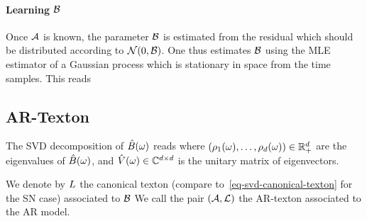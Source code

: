 \paragraph*{Learning $\mathcal{B}$}

Once $\mathcal{A}$ is known, the parameter $\mathcal{B}$ is estimated from the residual
which should be distributed according to $\mathcal{N}(0, \mathcal{B})$. One thus estimates $\mathcal{B}$ using the MLE estimator of a Gaussian process which is stationary in space from the time samples. This reads




\subsection{AR-Texton}

The SVD decomposition of $\hat B(\omega)$ reads
where $(\rho_1(\omega),\ldots,\rho_d(\omega)) \in \mathbb{R}_+^d$ are the eigenvalues of $\hat B(\omega)$, and $\hat V(\omega) \in \mathbb{C}^{d \times d}$ is the unitary matrix of eigenvectors.

We denote by $L$ the canonical texton (compare to~\eqref{eq-svd-canonical-texton} for the SN case) associated to $\mathcal{B}$
We call the pair $(\mathcal{A},\mathcal{L})$ the AR-texton associated to the AR model.


